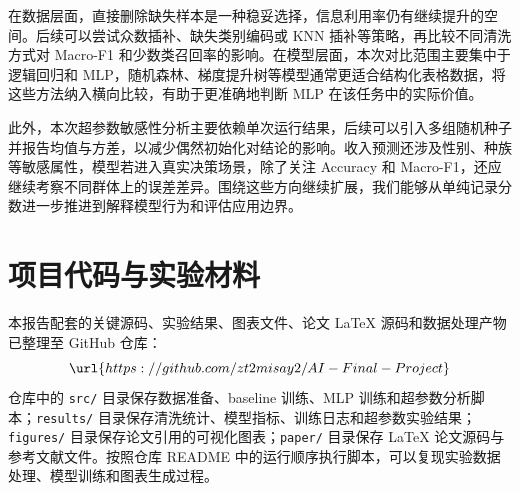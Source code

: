 \documentclass[UTF8,a4paper,12pt]{ctexart}
\begin{document}
在数据层面，直接删除缺失样本是一种稳妥选择，信息利用率仍有继续提升的空间。后续可以尝试众数插补、缺失类别编码或 KNN 插补等策略，再比较不同清洗方式对 Macro-F1 和少数类召回率的影响。在模型层面，本次对比范围主要集中于逻辑回归和 MLP，随机森林、梯度提升树等模型通常更适合结构化表格数据，将这些方法纳入横向比较，有助于更准确地判断 MLP 在该任务中的实际价值。

此外，本次超参数敏感性分析主要依赖单次运行结果，后续可以引入多组随机种子并报告均值与方差，以减少偶然初始化对结论的影响。收入预测还涉及性别、种族等敏感属性，模型若进入真实决策场景，除了关注 Accuracy 和 Macro-F1，还应继续考察不同群体上的误差差异。围绕这些方向继续扩展，我们能够从单纯记录分数进一步推进到解释模型行为和评估应用边界。

\appendix
\section{项目代码与实验材料}
本报告配套的关键源码、实验结果、图表文件、论文 LaTeX 源码和数据处理产物已整理至 GitHub 仓库：
\[
\url{https://github.com/zt2misay2/AI-Final-Project}
\]
仓库中的 \texttt{src/} 目录保存数据准备、baseline 训练、MLP 训练和超参数分析脚本；\texttt{results/} 目录保存清洗统计、模型指标、训练日志和超参数实验结果；\texttt{figures/} 目录保存论文引用的可视化图表；\texttt{paper/} 目录保存 \LaTeX{} 论文源码与参考文献文件。按照仓库 README 中的运行顺序执行脚本，可以复现实验数据处理、模型训练和图表生成过程。



\end{document}
